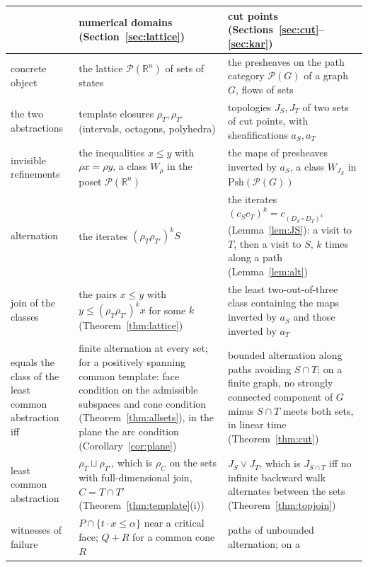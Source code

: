 \documentclass[11pt]{amsart}
\theoremstyle{definition}
\newcommand{\Psh}{\mathrm{Psh}}
\newcommand{\cP}{\mathcal P}
\begin{document}
\begin{table}[tp]
\centering\small
\renewcommand{\arraystretch}{1.25}
\begin{tabular}{@{}>{\raggedright\arraybackslash}p{}>{\raggedright\arraybackslash}p{}>{\raggedright\arraybackslash}p{}@{}}
\hline
 & numerical domains (Section~\ref{sec:lattice}) & cut points
 (Sections~\ref{sec:cut}--\ref{sec:kar})\\
\hline
concrete object & the lattice $\cP(\mathbb R^n)$ of sets of states &
 the presheaves on the path category $\cP(G)$ of a graph $G$, flows of
 sets\\
the two abstractions & template closures $\rho_T,\rho_{T'}$ (intervals,
 octagons, polyhedra) & topologies $J_S,J_T$ of two sets of cut points,
 with sheafifications $a_S,a_T$\\
invisible refinements & the inequalities $x\le y$ with $\rho x=\rho y$,
 a class $W_\rho$ in the poset $\cP(\mathbb R^n)$ & the maps of
 presheaves inverted by $a_S$, a class $W_{J_S}$ in $\Psh(\cP(G))$\\
alternation & the iterates $(\rho_T\rho_{T'})^kS$ & the iterates
 $(c_Sc_T)^k=c_{(D_S\circ D_T)^k}$ (Lemma~\ref{lem:JS}): a visit to $T$,
 then a visit to $S$, $k$ times along a path (Lemma~\ref{lem:alt})\\
join of the classes & the pairs $x\le y$ with $y\le(\rho_T\rho_{T'})^kx$
 for some $k$ (Theorem~\ref{thm:lattice}) & the least two-out-of-three
 class containing the maps inverted by $a_S$ and those inverted by
 $a_T$\\
equals the class of the least common abstraction iff & finite
 alternation at every set; for a positively spanning common template:
 face condition on the admissible subspaces and cone condition
 (Theorem~\ref{thm:allsets}), in the plane the arc condition
 (Corollary~\ref{cor:plane}) & bounded alternation along paths avoiding
 $S\cap T$; on a finite graph, no strongly connected component of $G$
 minus $S\cap T$ meets both sets, in linear time (Theorem~\ref{thm:cut})\\
least common abstraction & $\rho_T\sqcup\rho_{T'}$, which is $\rho_C$ on
 the sets with full-dimensional join, $C=T\cap T'$
 (Theorem~\ref{thm:template}(i)) & $J_S\vee J_T$, which is $J_{S\cap T}$
 iff no infinite backward walk alternates between the sets
 (Theorem~\ref{thm:topjoin})\\
witnesses of failure & $P\cap\{t\cdot x\le\alpha\}$ near a critical face;
 $Q+R$ for a common cone $R$ & paths of unbounded alternation; on a

\end{tabular}
\end{table}
\end{document}
